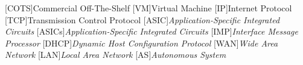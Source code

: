 [COTS]{Commercial Off-The-Shelf}
[VM]{Virtual Machine}
[IP]{Internet Protocol}
[TCP]{Transmission Control Protocol}
[ASIC]{\textit{Application-Specific Integrated Circuits}}
[ASICs]{\textit{Application-Specific Integrated Circuits}}
[IMP]{\textit{Interface Message Processor}}
[DHCP]{\textit{Dynamic Host Configuration Protocol}}
[WAN]{\textit{Wide Area Network}}
[LAN]{\textit{Local Area Network}}
[AS]{\textit{Autonomous System}}
